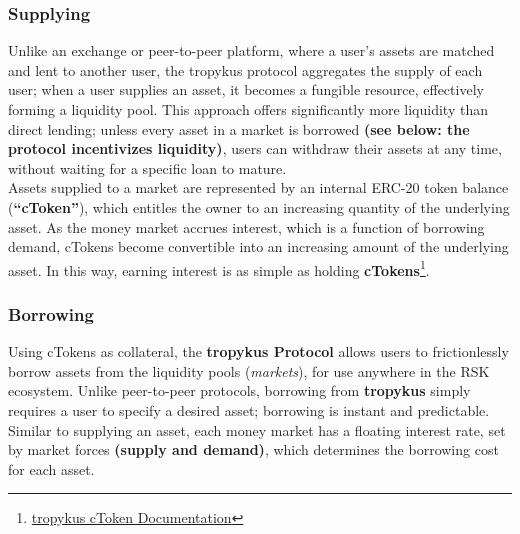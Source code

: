 \documentclass{article}
\begin{document}
\subsubsection{Supplying}
Unlike an exchange or peer-to-peer platform, where a user's assets are matched and lent to another
user, the tropykus protocol aggregates the supply of each user; when a user supplies an asset, it
becomes a fungible resource, effectively forming a liquidity pool. This approach offers significantly more liquidity than direct lending; unless every asset in a market is borrowed \textbf{(see below: the protocol incentivizes liquidity)}, users can withdraw their assets at any time, without waiting for a specific loan to mature.
\\
Assets supplied to a market are represented by an internal ERC-20 token balance (\textbf{“cToken”}), which entitles the owner to an increasing quantity of the underlying asset. As the money market accrues interest, which is a function of borrowing demand, cTokens become convertible into an increasing amount of the underlying asset. In this way, earning interest is as simple as holding \textbf{cTokens}\footnote{\href{https://test.tropykus.app/doc/keyConcepts\#ctokens}{tropykus cToken Documentation}}.

\subsubsection{Borrowing}

Using cTokens as collateral, the \textbf{tropykus Protocol} allows users to frictionlessly borrow assets from the liquidity pools (\textit{markets}), for use anywhere in the RSK ecosystem. Unlike peer-to-peer protocols, borrowing from \textbf{tropykus} simply requires a user to specify a desired asset; borrowing is instant and predictable. Similar to supplying an asset, each money market has a floating interest rate, set by market forces \textbf{(supply and demand)}, which determines the borrowing cost for each asset.

\end{document}

